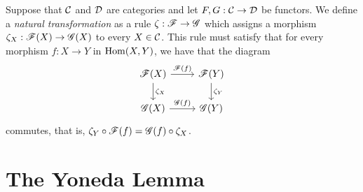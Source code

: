 \begin{definition}
Suppose that $\mathcal{C}$ and $\mathcal{D}$ are categories and let $F , G : \mathcal{C} \to \mathcal{D}$ be functors.
We define a \textit{natural transformation} as a rule $\zeta : \mathscr{F} \to \mathscr{G}$ which assigns a morphism $\zeta_X : \mathscr{F}(X) \to \mathscr{G}(X)$ to every $X \in \mathcal{C}$.
This rule must satisfy that for every morphism $f : X \to Y$ in $\operatorname{Hom}(X,Y)$, we have that the diagram
\[
\begin{tikzcd}
\Fscr(X) \arrow[r, "\Fscr(f)"] \arrow[d, "\zeta_X"] & \Fscr(Y) \arrow[d, "\zeta_Y"] \\
\Gscr(X) \arrow[r, "\Gscr(f)"]                      & \Gscr(Y)                     
\end{tikzcd}
\]
commutes, that is, $\zeta_Y \circ \mathscr{F}(f) = \mathscr{G}(f) \circ \zeta_X$.
\end{definition}


\section{The Yoneda Lemma}


